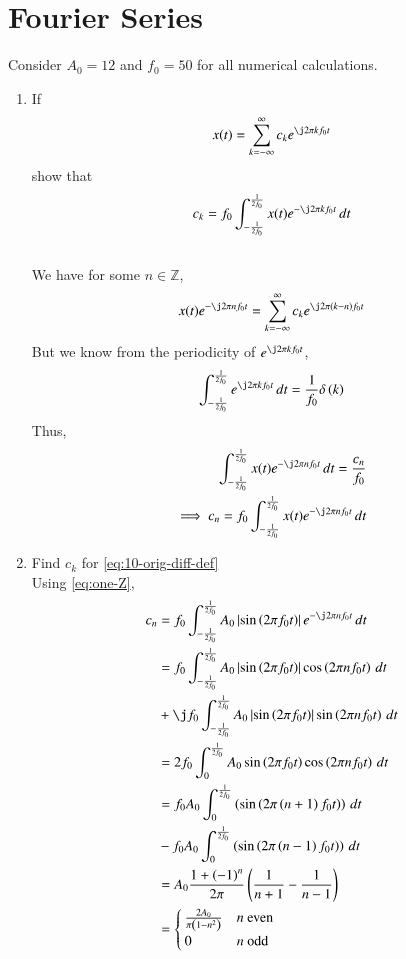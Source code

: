 \documentclass[journal,12pt,twocolumn]{IEEEtran}
\renewcommand\thesection{\arabic{section}}
\begin{document}
\section{Fourier Series}
Consider $A_0 =12$ and $f_0 = 50$ for all numerical calculations.
\begin{enumerate}[label=\thesection.\arabic*,ref=\thesection.\theenumi]
\item If
\begin{align}
x(t) = \sum_{k = -\infty}^{\infty}c_ke^{\j2\pi kf_0 t}
\label{eq:one-Z-complex}
\end{align}
show that
\begin{align}
c_k = f_0\int_{-\frac{1}{2f_0}}^{\frac{1}{2f_0}}x(t)e^{-\j2\pi kf_0 t}\, dt
\label{eq:one-Z}
\end{align} \\
\solution We have for some $n \in \mathbb{Z}$,
\begin{align}
x(t)e^{-\j2\pi nf_0t} = \sum_{k = -\infty}^{\infty}c_ke^{\j2\pi (k - n)f_0 t}
\end{align}
But we know from the periodicity of $e^{\j2\pi kf_0t}$,
\begin{align}
\int_{-\frac{1}{2f_0}}^{\frac{1}{2f_0}}e^{\j2\pi kf_0 t}\, dt =
\frac{1}{f_0}\delta\brak{k}
\end{align}
Thus,
\begin{align}
\int_{-\frac{1}{2f_0}}^{\frac{1}{2f_0}}x(t)e^{-\j2\pi nf_0 t}\, dt =
\frac{c_n}{f_0} \\
\implies c_n = f_0\int_{-\frac{1}{2f_0}}^{\frac{1}{2f_0}}x(t)e^{-\j2\pi nf_0 t}\, dt
\end{align}
\item Find $c_k$ for
\eqref{eq:10-orig-diff-def} \\
\solution Using \eqref{eq:one-Z},
\begin{align}
c_n &= f_0\int_{-\frac{1}{2f_0}}^{\frac{1}{2f_0}}A_0\abs{\sin\brak{2\pi f_0t}}
e^{-\j2\pi nf_0t}\, dt \\
&= f_0\int_{-\frac{1}{2f_0}}^{\frac{1}{2f_0}}A_0\abs{\sin\brak{2\pi f_0t}}
\cos\brak{2\pi nf_0t}\, dt \nonumber \\
&+ \j f_0\int_{-\frac{1}{2f_0}}^{\frac{1}{2f_0}}A_0
\abs{\sin\brak{2\pi f_0t}}\sin\brak{2\pi nf_0t}\, dt \\
&= 2f_0\int_{0}^{\frac{1}{2f_0}}A_0\sin\brak{2\pi f_0t}\cos\brak{2\pi nf_0t}\, dt \\
&= f_0A_0\int_{0}^{\frac{1}{2f_0}}\brak{\sin\brak{2\pi\brak{n+1}f_0t}}\, dt \nonumber \\
&- f_0A_0\int_{0}^{\frac{1}{2f_0}}\brak{\sin\brak{2\pi\brak{n-1}f_0t}}\, dt \\
&= A_0\frac{1+\brak{-1}^n}{2\pi}\brak{\frac{1}{n+1} - \frac{1}{n-1}} \\
&=
\begin{cases}
\frac{2A_0}{\pi\brak{1-n^2}} & n\ \text{even} \\
0 & n\ \text{odd}
\end{cases}
\label{eq:ck-xt}
\end{align}


\end{enumerate}
\end{document}
